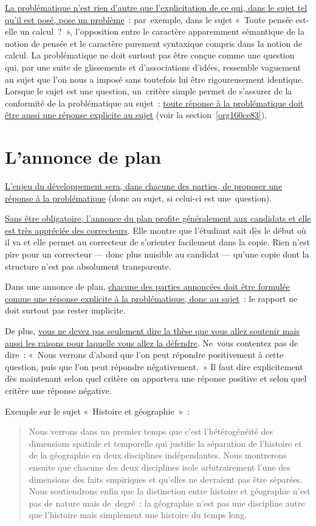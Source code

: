 \documentclass[a4paper,12pt]{report}
\begin{document}
\uline{La problématique n'est rien d'autre que l'explicitation de ce qui, dans
le sujet tel qu'il est posé, pose un problème} : par exemple, dans le
sujet « Toute pensée est-elle un calcul ? », l'opposition entre le
caractère apparemment sémantique de la notion de pensée et le caractère
purement syntaxique compris dans la notion de calcul. La problématique
ne doit surtout pas être conçue comme une question qui, par une suite de
glissements et d'associations d'idées, ressemble vaguement au sujet que
l'on nous a imposé sans toutefois lui être rigoureusement identique.
Lorsque le sujet est une question, un critère simple permet de s'assurer
de la conformité de la problématique au sujet : \uline{toute réponse à la
problématique doit être aussi une réponse explicite au sujet} (voir la
section \ref{org160ce83}).



\section{L'annonce de plan}
\label{sec:org4260ec5}
\label{org12a11a1}

\uline{L'enjeu du développement sera, dans chacune des parties, de proposer
une réponse à la problématique} (donc au sujet, si celui-ci est
une question).

\uline{Sans être obligatoire, l'annonce du plan profite généralement aux
candidats et elle est très appréciée des correcteurs}. Elle montre que
l'étudiant sait dès le début où il va et elle permet au correcteur de
s'orienter facilement dans la copie. Rien n'est pire pour un correcteur
— donc plus nuisible au candidat — qu'une copie dont la structure n'est
pas absolument transparente.

Dans une annonce de plan, \uline{chacune des parties annoncées doit être
formulée comme une réponse explicite à la problématique, donc au
sujet} : le rapport ne doit surtout pas rester implicite.

De plus, \uline{vous ne devez pas seulement dire la thèse que vous allez
soutenir mais aussi les raisons pour laquelle vous allez la défendre}.
Ne vous contentez pas de dire : « Nous verrons d'abord que l'on peut
répondre positivement à cette question, puis que l'on peut répondre
négativement. » Il faut dire explicitement dès maintenant selon quel
critère on apportera une réponse positive et selon quel critère une
réponse négative.

Exemple sur le sujet « Histoire et géographie » :
\begin{quotation}
Nous verrons dans un premier temps que c'est l'hétérogénéité des
dimensions spatiale et temporelle qui justifie la séparation de
l'histoire et de la géographie en deux disciplines indépendantes. Nous
montrerons ensuite que chacune des deux disciplines isole arbitrairement
l'une des dimensions des faits empiriques et qu'elles ne devraient pas
être séparées. Nous soutiendrons enfin que la distinction entre histoire
et géographie n'est pas de nature mais de degré : la géographie n'est
pas une discipline autre que l'histoire mais simplement une histoire du
temps long.
\end{quotation}
\end{document}

